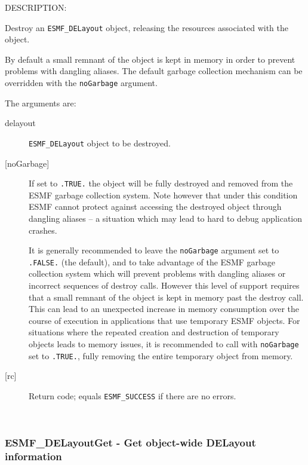 {\sf DESCRIPTION:\\ }


     Destroy an {\tt ESMF\_DELayout} object, releasing the resources associated
     with the object.
  
     By default a small remnant of the object is kept in memory in order to 
     prevent problems with dangling aliases. The default garbage collection
     mechanism can be overridden with the {\tt noGarbage} argument.
  
   The arguments are:
   \begin{description}
   \item[delayout] 
        {\tt ESMF\_DELayout} object to be destroyed.
   \item[{[noGarbage]}]
        If set to {\tt .TRUE.} the object will be fully destroyed and removed
        from the ESMF garbage collection system. Note however that under this 
        condition ESMF cannot protect against accessing the destroyed object 
        through dangling aliases -- a situation which may lead to hard to debug 
        application crashes.
   
        It is generally recommended to leave the {\tt noGarbage} argument
        set to {\tt .FALSE.} (the default), and to take advantage of the ESMF 
        garbage collection system which will prevent problems with dangling
        aliases or incorrect sequences of destroy calls. However this level of
        support requires that a small remnant of the object is kept in memory
        past the destroy call. This can lead to an unexpected increase in memory
        consumption over the course of execution in applications that use 
        temporary ESMF objects. For situations where the repeated creation and 
        destruction of temporary objects leads to memory issues, it is 
        recommended to call with {\tt noGarbage} set to {\tt .TRUE.}, fully 
        removing the entire temporary object from memory.
   \item[{[rc]}] 
        Return code; equals {\tt ESMF\_SUCCESS} if there are no errors.
   \end{description}
   
 
\mbox{}\hrulefill\ 
 
\subsubsection [ESMF\_DELayoutGet] {ESMF\_DELayoutGet - Get object-wide DELayout information}


